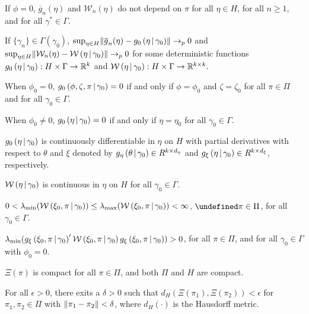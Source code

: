 \documentclass[11pt]{article}
\newcommand*{\R}{\mathbb{R}}
\newcommand*{\W}{\mathcal{W}}
\newcommand*{\pto}{\ensuremath{\to_p}}
\newcommand*{\Eta}{H}
\newcommand*{\sampmom}{\ensuremath{\overline{g}_n}}
\DeclarePairedDelimiter\norm{\lVert}{\rVert}
\let\oldforall\forall
\let\forall\undefined
\DeclareMathOperator{\forall}{\oldforall}
\newcommand{\mvert}[1][\middle]{\ensuremath{\,#1\vert\,}}
\begin{document}
\begin{assump}[GMM 1]\label{ass:GMM1}
\begin{assumplist}
    \item If $\phi=0$, $\sampmom(\eta)$ and $\W_{n}(\eta)$ do not depend on $\pi$ for all $\eta \in \Eta$, for
        all $n \geq 1$, and for all $\gamma^{*}\in \Gamma.$ 
        \label{ass:GMM1a}
    \item If $\lbrace \gamma_{n} \rbrace \in \Gamma\left(\gamma_0\right)$, $\sup_{\eta \in \Eta}
        \norm*{\sampmom(\eta) - g_0\left(\eta \mvert \gamma_0\right)} \pto 0$ and $\sup_{\eta
        \in \Eta} \norm{\W_{n}(\eta)-\W\left(\eta \mvert \gamma_0\right)} \pto 0$ for some deterministic
        functions $g_0\left(\eta \mvert \gamma_0\right) : \Eta \times \Gamma \to \R^{k}$ and
        $\W\left(\eta \mvert \gamma_0\right) : \Eta \times \Gamma \to \R^{k\times k}.$
        \label{ass:GMM1b}
    \item When $\phi_0=0$,  $g_0\left(\phi, \zeta ,\pi \mvert \gamma_0\right) = 0$ if and only if $\phi =\phi_0$
        and $\zeta = \zeta_0$ for all $\pi \in \Pi$ and for all $\gamma_0 \in \Gamma.$
        \label{ass:GMM1c}
    \item When $\phi_0 \neq 0$, $g_0\left(\eta \mvert \gamma_0\right)=0$ if and only if $\eta =\eta_0$ for all 
        $\gamma_0 \in \Gamma.$
        \label{ass:GMM1d}
    \item  $g_0\left(\eta \mvert \gamma_0\right)$ is continuously differentiable in $\eta $ on $\Eta$ with partial
        derivatives with respect to $\theta$ and $\xi$ denoted by $g_{\eta }\left(\theta \mvert
        \gamma_0\right) \in R^{k\times d_{\eta }}$ and $g_{\xi }\left(\eta \mvert \gamma_0\right)\in R^{k\times
        d_{\xi }}$, respectively.
        \label{ass:GMM1e}
    \item $\W\left(\eta \mvert \gamma_0\right)$ is continuous in $\eta$ on $\Eta$ for all $\gamma_0\in \Gamma$.
        \label{ass:GMM1f}
    \item $0 < \lambda_{\min}(\W\left(\xi_0, \pi \mvert \gamma_0\right))\leq \lambda_{\max }(\W\left(\xi_0,\pi
        \mvert \gamma_0\right)) < \infty$, $\forall \pi \in \Pi$, for all $\gamma_0 \in \Gamma$.
        \label{ass:GMM1g}
    \item $\lambda_{\min} (g_{\xi}\left(\xi_0,\pi \mvert \gamma_0\right)^{\prime} \W\left(\xi_0,\pi \mvert
        \gamma_0\right)g_{\xi }\left(\xi_0,\pi \mvert \gamma_0\right))>0$, for all $\pi \in \Pi$,  and for all 
        $\gamma_0 \in \Gamma$ with $\phi_0=0.$
        \label{ass:GMM1h}
    \item$\Xi(\pi)$ is compact for all $\pi \in \Pi$, and both $\Pi$ and $\Eta$ are compact.
        \label{ass:GMM1i}
    \item For all $\epsilon > 0$, there exits a $\delta > 0$ such that $d_{H}\left(\Xi \left(\pi_{1}\right), \Xi
        \left( \pi_{2}\right) \right) < \epsilon$ for $\pi_{1}, \pi_{2} \in \Pi$ with $\norm*{\pi_{1}-\pi_{2}} <
        \delta$, where $d_{H}\left( \cdot \right)$ is the Hausdorff metric.
        \label{ass:GMM1j}
\end{assumplist}
\end{assump}
\end{document}
